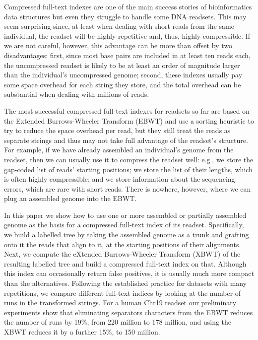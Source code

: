 
\newcommand{\inputXBWT}[1]{}
\newcommand{\figXBWT}[2]{\texttt{[image: Part\_Two/xbwt/\#2]}}

\begin{small}

Compressed full-text indexes are one of the main success stories of bioinformatics data structures but even they struggle to handle some DNA readsets.  This may seem surprising since, at least when dealing with short reads from the same individual, the readset will be highly repetitive and, thus, highly compressible.  If we are not careful, however, this advantage can be more than offset by two disadvantages: first, since most base pairs are included in at least ten reads each, the uncompressed readset is likely to be at least an order of magnitude larger than the individual's uncompressed genome; second, these indexes usually pay some space overhead for each string they store, and the total overhead can be substantial when dealing with millions of reads.


The most successful compressed full-text indexes for readsets so far are based on the Extended Burrows-Wheeler Transform (EBWT) and use a sorting heuristic to try to reduce the space overhead per read, but they still treat the reads as separate strings and thus may not take full advantage of the readset's structure.  For example, if we have already assembled an individual's genome from the readset, then we can usually use it to compress the readset well: e.g., we store the gap-coded list of reads' starting positions; we store the list of their lengths, which is often highly compressible; and we store information about the sequencing errors, which are rare with short reads.  There is nowhere, however, where we can plug an assembled genome into the EBWT.

In this paper we show how to use one or more assembled or partially assembled genome as the basis for a compressed full-text index of its readset.  Specifically, we build a labelled tree by taking the assembled genome as a trunk and grafting onto it the reads that align to it, at the starting positions of their alignments.  Next, we compute the eXtended Burrows-Wheeler Transform (XBWT) of the resulting labelled tree and build a compressed full-text index on that. Although this index can occasionally return false positives, it is usually much more compact than the alternatives.
Following the established practice for datasets with many repetitions, we compare different full-text indices by looking at the number of runs in the transformed strings. For a human Chr19 readset our preliminary experiments show that eliminating separators characters from the EBWT reduces the number of runs by 19\%, from 220 million to 178 million, and using the XBWT reduces it by a further 15\%, to 150 million.\\


\end{small}
